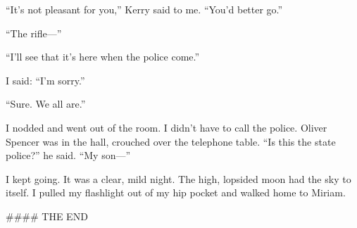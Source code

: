 \documentclass{novel}
\begin{document}
{“It’s not pleasant for you,” Kerry said to me. “You’d better go.”

“The rifle—”

“I’ll see that it’s here when the police come.”

I said: “I’m sorry.”

“Sure. We all are.”

I nodded and went out of the room. I didn’t have to call the police. Oliver Spencer was in the hall, crouched over the telephone table. “Is this the state police?” he said. “My son—”

I kept going. It was a clear, mild night. The high, lopsided moon had the sky to itself. I pulled my flashlight out of my hip pocket and walked home to Miriam.

#### THE END 
}

\vspace{2\nbs}
\clearpage
\thispagestyle{empty}
\end{document}
